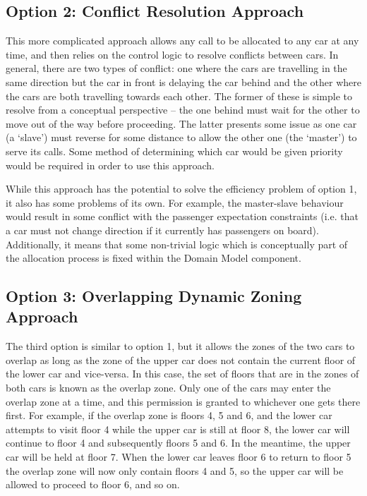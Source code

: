 \documentclass{UoYCSproject}
\begin{document}
\subsection{Option 2: Conflict Resolution Approach}

This more complicated approach allows any call to be allocated to any car at any time, and then relies on the control logic to resolve conflicts between cars.  In general, there are two types of conflict: one where the cars are travelling in the same direction but the car in front is delaying the car behind and the other where the cars are both travelling towards each other.  The former of these is simple to resolve from a conceptual perspective – the one behind must wait for the other to move out of the way before proceeding.  The latter presents some issue as one car (a `slave') must reverse for some distance to allow the other one (the `master') to serve its calls.  Some method of determining which car would be given priority would be required in order to use this approach.

While this approach has the potential to solve the efficiency problem of option 1, it also has some problems of its own.  For example, the master-slave behaviour would result in some conflict with the passenger expectation constraints (i.e. that a car must not change direction if it currently has passengers on board).  Additionally, it means that some non-trivial logic which is conceptually part of the allocation process is fixed within the Domain Model component.

\subsection{Option 3: Overlapping Dynamic Zoning Approach}

The third option is similar to option 1, but it allows the zones of the two cars to overlap as long as the zone of the upper car does not contain the current floor of the lower car and vice-versa.  In this case, the set of floors that are in the zones of both cars is known as the overlap zone.  Only one of the cars may enter the overlap zone at a time, and this permission is granted to whichever one gets there first.  For example, if the overlap zone is floors 4, 5 and 6, and the lower car attempts to visit floor 4 while the upper car is still at floor 8, the lower car will continue to floor 4 and subsequently floors 5 and 6.  In the meantime, the upper car will be held at floor 7.  When the lower car leaves floor 6 to return to floor 5 the overlap zone will now only contain floors 4 and 5, so the upper car will be allowed to proceed to floor 6, and so on.
\end{document}
